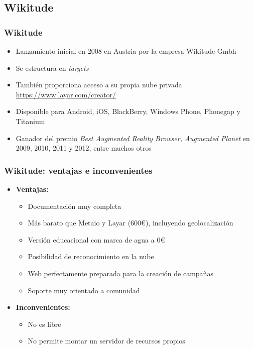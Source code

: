 \subsection*{Wikitude}
\frame
{
\frametitle{Wikitude}
\begin{itemize}
 \item Lanzamiento inicial en 2008 en Austria por la empresa Wikitude Gmbh
 \item Se estructura en \textit{targets}
 \item También proporciona acceso a su propia nube privada\\
   \url{https://www.layar.com/creator/}
 \item Disponible para Android, iOS, BlackBerry, Windows Phone, Phonegap y Titanium
 \item Ganador del premio \textit{Best Augmented Reality Browser, Augmented Planet} en 2009, 2010, 2011 y 2012, entre muchos otros
\end{itemize}
}

\frame
{
\frametitle{Wikitude: ventajas e inconvenientes}
\begin{itemize}
\item \textbf{Ventajas:}
  \begin{itemize}
   \item Documentación muy completa
   \item Más barato que Metaio y Layar (600\euro), incluyendo geolocalización
   \item Versión educacional con marca de agua a 0\euro
   \item Posibilidad de reconocimiento en la nube
   \item Web perfectamente preparada para la creación de campañas
   \item Soporte muy orientado a comunidad
  \end{itemize}

\item \textbf{Inconvenientes:}
  \begin{itemize}
   \item No es libre
   \item No permite montar un servidor de recursos propios
  \end{itemize}

\end{itemize}
}
